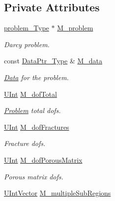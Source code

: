 \subsection*{Private Attributes}
\begin{DoxyCompactItemize}
\item 
\hyperlink{classFVCode3D_1_1MSR_aee0f8176a894e4f695baa08af10d14cf}{problem\+\_\+\+Type} $\ast$ \hyperlink{classFVCode3D_1_1MSR_a531760a5415f63b7be6087ab117031e5}{M\+\_\+problem}
\begin{DoxyCompactList}\small\item\em Darcy problem. \end{DoxyCompactList}\item 
const \hyperlink{namespaceFVCode3D_a3d19a370a98afe491a9e17a646a9c56f}{Data\+Ptr\+\_\+\+Type} \& \hyperlink{classFVCode3D_1_1MSR_a03e013e5191655455e66563e815f262b}{M\+\_\+data}
\begin{DoxyCompactList}\small\item\em \hyperlink{classFVCode3D_1_1Data}{Data} for the problem. \end{DoxyCompactList}\item 
\hyperlink{namespaceFVCode3D_a4bf7e328c75d0fd504050d040ebe9eda}{U\+Int} \hyperlink{classFVCode3D_1_1MSR_a52fc7223f5d641543781b1224e686610}{M\+\_\+dof\+Total}
\begin{DoxyCompactList}\small\item\em \hyperlink{classFVCode3D_1_1Problem}{Problem} total dofs. \end{DoxyCompactList}\item 
\hyperlink{namespaceFVCode3D_a4bf7e328c75d0fd504050d040ebe9eda}{U\+Int} \hyperlink{classFVCode3D_1_1MSR_ae96e6d741dd194e8be925062759acbc9}{M\+\_\+dof\+Fractures}
\begin{DoxyCompactList}\small\item\em Fracture dofs. \end{DoxyCompactList}\item 
\hyperlink{namespaceFVCode3D_a4bf7e328c75d0fd504050d040ebe9eda}{U\+Int} \hyperlink{classFVCode3D_1_1MSR_a04c41dbcba341c70158af3db7b69916e}{M\+\_\+dof\+Porous\+Matrix}
\begin{DoxyCompactList}\small\item\em Porous matrix dofs. \end{DoxyCompactList}\item 
\hyperlink{namespaceFVCode3D_a9c3dcef0872c1dbd4aaf770d08421fd7}{U\+Int\+Vector} \hyperlink{classFVCode3D_1_1MSR_a38cba0138e4ebd055d47b3d9d9d32623}{M\+\_\+multiple\+Sub\+Regions}

\end{DoxyCompactItemize}
